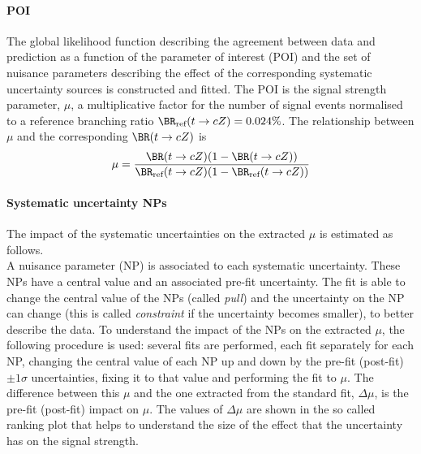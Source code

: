 \paragraph{POI} The global likelihood function describing the
agreement between data and prediction as a function of the parameter
of interest (POI) and the set of nuisance parameters describing the
effect of the corresponding systematic uncertainty sources is
constructed and fitted. The POI is the signal strength parameter, $\mu$,
a multiplicative factor for the number of signal events normalised to a reference branching ratio
$\BR_{\text{ref}}(t\rightarrow cZ)=0.024\%$.
The relationship between $\mu$ and the corresponding $\BR(t\rightarrow cZ)$ is
\begin{equation}
\mu=\frac{\BR(t\rightarrow cZ)(1-\BR(t\rightarrow cZ))}{\BR_{\text{ref}}(t\rightarrow cZ)(1-\BR_{\text{ref}}(t\rightarrow cZ))}
\end{equation}

\paragraph{Systematic uncertainty NPs} The impact of the systematic
uncertainties on the extracted $\mu$ is estimated as follows. \\
A nuisance parameter (NP) is associated to each systematic uncertainty.
These NPs have a central value and an associated pre-fit uncertainty.
The fit is able to change the central value of the NPs (called \textit{pull})
and the uncertainty on the NP can change (this is called \textit{constraint}
if the uncertainty becomes smaller), to better describe the data.
To understand the impact of the NPs on the extracted $\mu$, the
following procedure is used:
several fits are performed, each fit separately for each NP,
changing the central value of each NP up and down by the pre-fit
(post-fit) $\pm 1 \sigma$ uncertainties,
fixing it to that value and performing the fit to $\mu$.
The difference between this $\mu$ and the one extracted from the
standard fit, $\Delta\mu$, is the pre-fit (post-fit) impact on $\mu$.
The values of $\Delta\mu$ are shown in the so called ranking plot that 
helps to understand the size of the effect that
the uncertainty has on the signal strength. \\

